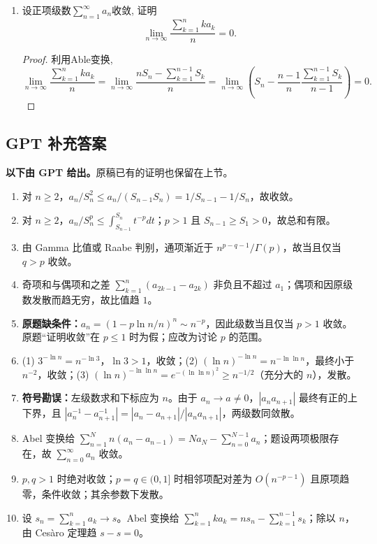\documentclass[UTF8,11pt, a4paper, oneside, fontset=none]{ctexbook}
\begin{document}
\begin{enumerate}
\begin{proof}
\end{proof}



\item 设正项级数$\sum_{n=1}^{\infty} a_n$收敛, 证明
\[
\lim_{n \to \infty} \frac{\sum_{k=1}^n k a_k}{n} = 0.
\]


\begin{proof}

利用Able变换,
\[
\lim_{n \to \infty} \frac{\sum_{k=1}^n k a_k}{n} = \lim_{n \to \infty} \frac{n S_n - \sum_{k=1}^{n-1} S_k}{n} =  \lim_{n \to \infty} \left( S_n - \frac{n-1}{n} \frac{\sum_{k=1}^{n-1} S_k}{n-1} \right) =0.
\]

\end{proof}
\end{enumerate}

\clearpage

\subsection*{GPT 补充答案}

\noindent\textbf{以下由 GPT 给出。}原稿已有的证明也保留在上节。
\begin{enumerate}
\item 对 $n\ge2$，$a_n/S_n^2\le a_n/(S_{n-1}S_n)=1/S_{n-1}-1/S_n$，故收敛。
\item 对 $n\ge2$，$a_n/S_n^p\le\int_{S_{n-1}}^{S_n}t^{-p}dt$；$p>1$ 且 $S_{n-1}\ge S_1>0$，故总和有限。
\item 由 Gamma 比值或 Raabe 判别，通项渐近于 $n^{p-q-1}/\Gamma(p)$，故当且仅当 $q>p$ 收敛。
\item 奇项和与偶项和之差 $\sum_{k=1}^n(a_{2k-1}-a_{2k})$ 非负且不超过 $a_1$；偶项和因原级数发散而趋无穷，故比值趋 $1$。
\item \textbf{原题缺条件：}$a_n=(1-p\ln n/n)^n\sim n^{-p}$，因此级数当且仅当 $p>1$ 收敛。原题“证明收敛”在 $p\le1$ 时为假；应改为讨论 $p$ 的范围。
\item (1) $3^{-\ln n}=n^{-\ln3}$，$\ln3>1$，收敛；(2) $(\ln n)^{-\ln n}=n^{-\ln\ln n}$，最终小于 $n^{-2}$，收敛；(3) $(\ln n)^{-\ln\ln n}=e^{-(\ln\ln n)^2}\ge n^{-1/2}$（充分大的 $n$），发散。
\item \textbf{符号勘误：}左级数求和下标应为 $n$。由于 $a_n\to a\ne0$，$|a_na_{n+1}|$ 最终有正的上下界，且 $|a_n^{-1}-a_{n+1}^{-1}|=|a_n-a_{n+1}|/|a_na_{n+1}|$，两级数同敛散。
\item Abel 变换给 $\sum_{n=1}^Nn(a_n-a_{n-1})=Na_N-\sum_{n=0}^{N-1}a_n$；题设两项极限存在，故 $\sum_{n=0}^\infty a_n$ 收敛。
\item $p,q>1$ 时绝对收敛；$p=q\in(0,1]$ 时相邻项配对差为 $O(n^{-p-1})$ 且原项趋零，条件收敛；其余参数下发散。
\item 设 $s_n=\sum_{k=1}^na_k\to s$。Abel 变换给 $\sum_{k=1}^nka_k=ns_n-\sum_{k=1}^{n-1}s_k$；除以 $n$，由 Ces\`aro 定理趋 $s-s=0$。
\end{enumerate}
\end{document}
